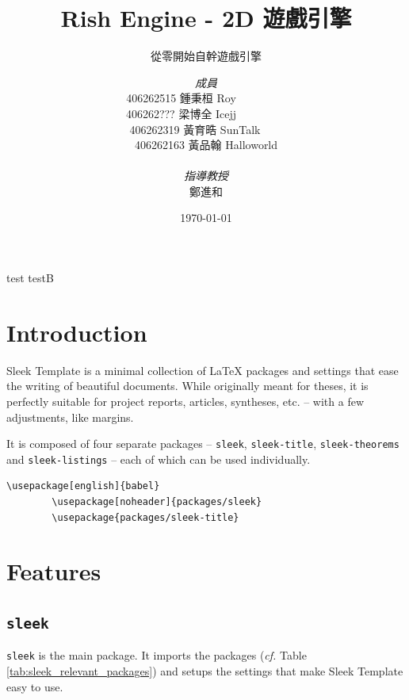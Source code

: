 \documentclass[a4paper, 12pt]{report}
\institute{輔仁大學資訊工程學系}
\title{Rish Engine - 2D 遊戲引擎}
\subtitle{從零開始自幹遊戲引擎}
\author{\textit{成員} \\
	406262515 \textsc{鍾秉桓} Roy\ \ \ \ \ \ \ \ \  \\
    406262??? \textsc{梁博全} Icejj\ \ \ \ \ \ \ \ \  \\
    406262319 \textsc{黃育晧} SunTalk\ \ \ \  \\
    406262163 \textsc{黃品翰} Halloworld \\
    \ \\
    \textit{指導教授} \\
    鄭進和
}
\date{\today}
\begin{document}
    \maketitle
    \romantableofcontents

    test \cite{Benty20}
    testB \cite{pakin2020comprehensive}

    \printbibliography

    \chapter{Introduction}

    Sleek Template is a minimal collection of \LaTeX{} packages and settings that ease the writing of beautiful documents. While originally meant for theses, it is perfectly suitable for project reports, articles, syntheses, etc. -- with a few adjustments, like margins.

    It is composed of four separate packages -- \texttt{sleek}, \texttt{sleek-title}, \texttt{sleek-theorems} and \texttt{sleek-listings} -- each of which can be used individually.

    \begin{lstlisting}[style=latexFrameTB, caption={Example of Sleek Template packages usage.}, gobble=8]
        \usepackage[english]{babel}
        \usepackage[noheader]{packages/sleek}
        \usepackage{packages/sleek-title}
    \end{lstlisting}


    \chapter{Features}

    \section{\texttt{sleek}}

    \texttt{sleek} is the main package. It imports the packages (\emph{cf.} Table \ref{tab:sleek_relevant_packages}) and setups the settings that make Sleek Template easy to use.
\end{document}

